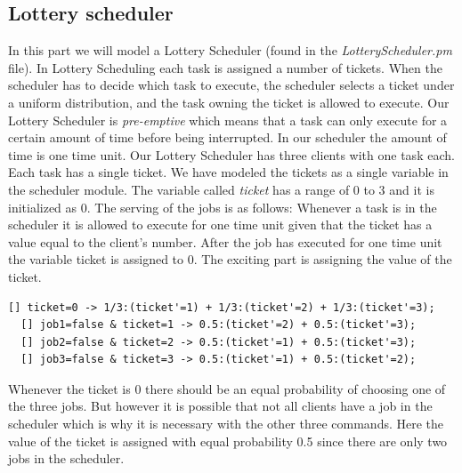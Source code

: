 \documentclass[12pt]{report}
\begin{document}
\subsection*{Lottery scheduler}
In this part we will model a Lottery Scheduler (found in the \emph{LotteryScheduler.pm} file). In Lottery Scheduling each task is assigned a number of tickets. When the scheduler has to decide which task to execute, the scheduler selects a ticket under a uniform distribution, and the task owning the ticket is allowed to execute. Our Lottery Scheduler is \emph{pre-emptive} which means that a task can only execute for a certain amount of time before being interrupted. In our scheduler the amount of time is one time unit.  Our Lottery Scheduler has three clients with one task each. Each task has a single ticket. We have modeled the tickets as a single variable in the scheduler module. The variable called \emph{ticket} has a range of 0 to 3 and it is initialized as 0. The serving of the jobs is as follows: Whenever a task is in the scheduler it is allowed to execute for one time unit given that the ticket has a value equal to the client's number. After the job has executed for one time unit the variable ticket is assigned to 0. The exciting part is assigning the value of the ticket.

\begin{lstlisting}[style=prismmodel, caption={Assigning the value of the ticket}]
  [] ticket=0 -> 1/3:(ticket'=1) + 1/3:(ticket'=2) + 1/3:(ticket'=3);
  [] job1=false & ticket=1 -> 0.5:(ticket'=2) + 0.5:(ticket'=3);
  [] job2=false & ticket=2 -> 0.5:(ticket'=1) + 0.5:(ticket'=3);
  [] job3=false & ticket=3 -> 0.5:(ticket'=1) + 0.5:(ticket'=2);
\end{lstlisting}
Whenever the ticket is 0 there should be an equal probability of choosing one of the three jobs. But however it is possible that not all clients have a job in the scheduler which is why it is necessary with the other three commands. Here the value of the ticket is assigned with equal probability 0.5 since there are only two jobs in the scheduler.
\end{document}

